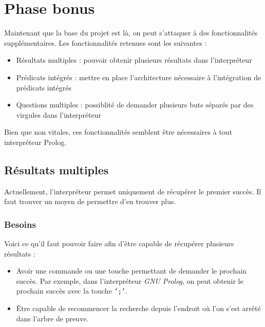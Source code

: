 \documentclass[../report.tex]{subfiles}
\begin{document}
\section{Phase bonus}
Maintenant que la base du projet est là, on peut s'attaquer à des fonctionnalités supplémentaires. Les fonctionnalités retenues sont les suivantes :
\begin{itemize}
    \item Résultats multiples : pouvoir obtenir plusieurs résultats dans l'interpréteur
    \item Prédicats intégrés : mettre en place l'architecture nécessaire à l'intégration de prédicats intégrés
    \item Questions multiples : possiblité de demander plusieurs buts séparés par des virgules dans l'interpréteur
\end{itemize}
Bien que non vitales, ces fonctionnalités semblent être nécessaires à tout interpréteur Prolog.
\subsection{Résultats multiples}
Actuellement, l'interpréteur permet uniquement de récupérer le premier succès. Il faut trouver un moyen de permettre d'en trouver plus.
\subsubsection{Besoins}
Voici ce qu'il faut pouvoir faire afin d'être capable de récupérer plusieurs résultats :
\begin{itemize}
    \item Avoir une commande ou une touche permettant de demander le prochain succès. Par exemple, dans l'interpréteur \textit{GNU Prolog}, on peut obtenir le prochain succès avec la touche \texttt{';'}.
    \item Être capable de recommencer la recherche depuis l'endroit où l'on s'est arrêté dans l'arbre de preuve.
\end{itemize}
\end{document}
